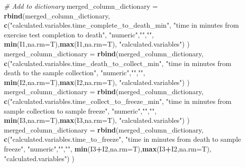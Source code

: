 \documentclass[]{article}
\newenvironment{Shaded}{\begin{snugshade}}{\end{snugshade}}
\newcommand{\KeywordTok}[1]{\textcolor[rgb]{0.13,0.29,0.53}{\textbf{#1}}}
\newcommand{\DataTypeTok}[1]{\textcolor[rgb]{0.13,0.29,0.53}{#1}}
\newcommand{\StringTok}[1]{\textcolor[rgb]{0.31,0.60,0.02}{#1}}
\newcommand{\CommentTok}[1]{\textcolor[rgb]{0.56,0.35,0.01}{\textit{#1}}}
\newcommand{\OperatorTok}[1]{\textcolor[rgb]{0.81,0.36,0.00}{\textbf{#1}}}
\newcommand{\NormalTok}[1]{#1}
\begin{document}
\begin{Shaded}
\begin{Highlighting}[]
\CommentTok{# Add to dictionary}
\NormalTok{merged_column_dictionary =}\StringTok{ }\KeywordTok{rbind}\NormalTok{(merged_column_dictionary,}
  \KeywordTok{c}\NormalTok{(}\StringTok{"calculated.variables.time_complete_to_death_min"}\NormalTok{,}
    \StringTok{"time in minutes from exercise test completion to death"}\NormalTok{,}
    \StringTok{"numeric"}\NormalTok{,}\StringTok{""}\NormalTok{,}\StringTok{""}\NormalTok{,}
    \KeywordTok{min}\NormalTok{(I1,}\DataTypeTok{na.rm=}\NormalTok{T),}\KeywordTok{max}\NormalTok{(I1,}\DataTypeTok{na.rm=}\NormalTok{T),}
    \StringTok{"calculated.variables"}\NormalTok{)}
\NormalTok{)}
\NormalTok{merged_column_dictionary =}\StringTok{ }\KeywordTok{rbind}\NormalTok{(merged_column_dictionary,}
  \KeywordTok{c}\NormalTok{(}\StringTok{"calculated.variables.time_death_to_collect_min"}\NormalTok{,}
    \StringTok{"time in minutes from death to the sample collection"}\NormalTok{,}
    \StringTok{"numeric"}\NormalTok{,}\StringTok{""}\NormalTok{,}\StringTok{""}\NormalTok{,}
    \KeywordTok{min}\NormalTok{(I2,}\DataTypeTok{na.rm=}\NormalTok{T),}\KeywordTok{max}\NormalTok{(I2,}\DataTypeTok{na.rm=}\NormalTok{T),}
    \StringTok{"calculated.variables"}\NormalTok{)}
\NormalTok{)}
\NormalTok{merged_column_dictionary =}\StringTok{ }\KeywordTok{rbind}\NormalTok{(merged_column_dictionary,}
  \KeywordTok{c}\NormalTok{(}\StringTok{"calculated.variables.time_collect_to_freeze_min"}\NormalTok{,}
    \StringTok{"time in minutes from sample collection to sample freeze"}\NormalTok{,}
    \StringTok{"numeric"}\NormalTok{,}\StringTok{""}\NormalTok{,}\StringTok{""}\NormalTok{,}
    \KeywordTok{min}\NormalTok{(I3,}\DataTypeTok{na.rm=}\NormalTok{T),}\KeywordTok{max}\NormalTok{(I3,}\DataTypeTok{na.rm=}\NormalTok{T),}
    \StringTok{"calculated.variables"}\NormalTok{)}
\NormalTok{)}
\NormalTok{merged_column_dictionary =}\StringTok{ }\KeywordTok{rbind}\NormalTok{(merged_column_dictionary,}
  \KeywordTok{c}\NormalTok{(}\StringTok{"calculated.variables.time_to_freeze"}\NormalTok{,}
    \StringTok{"time in minutes from death to sample freeze"}\NormalTok{,}
    \StringTok{"numeric"}\NormalTok{,}\StringTok{""}\NormalTok{,}\StringTok{""}\NormalTok{,}
    \KeywordTok{min}\NormalTok{(I3}\OperatorTok{+}\NormalTok{I2,}\DataTypeTok{na.rm=}\NormalTok{T),}\KeywordTok{max}\NormalTok{(I3}\OperatorTok{+}\NormalTok{I2,}\DataTypeTok{na.rm=}\NormalTok{T),}
    \StringTok{"calculated.variables"}\NormalTok{)}
\NormalTok{)}


\end{Highlighting}
\end{Shaded}
\end{document}
